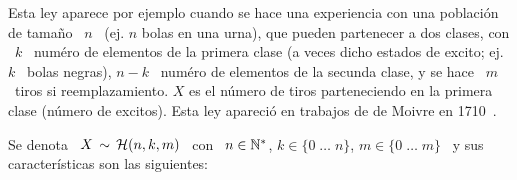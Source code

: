 \label{Sssec:MP:Hipergeometrica}

Esta ley aparece por ejemplo cuando  se hace una experiencia con una poblaci\'on
de tama\~no \  $n$ \ (ej.  $n$ bolas  en una urna), que pueden  partenecer a dos
clases, con  \ $k$ \ num\'ero  de elementos de  la primera clase (a  veces dicho
estados de excito; ej. $k$ \ bolas  negras), $n-k$ \ num\'ero de elementos de la
secunda clase, y se  hace \ $m$ \ tiros si reemplazamiento.   $X$ es el n\'umero
de  tiros parteneciendo  en la  primera clase  (n\'umero de  excitos).  Esta ley
apareci\'o en trabajos de de Moivre en 1710~\cite{Moi10, Hal90}.

Se denota \ $X \, \sim \, \mathcal{H}(n,k,m)$ \  con \ $n \in \mathbb{N}^*$, \quad $k \in \{ 0
\;  \ldots  \;  n  \}$,  \quad  $m  \in  \{  0 \;  \ldots  \;  m  \}$  \  y  sus
caracter\'isticas son las siguientes:

